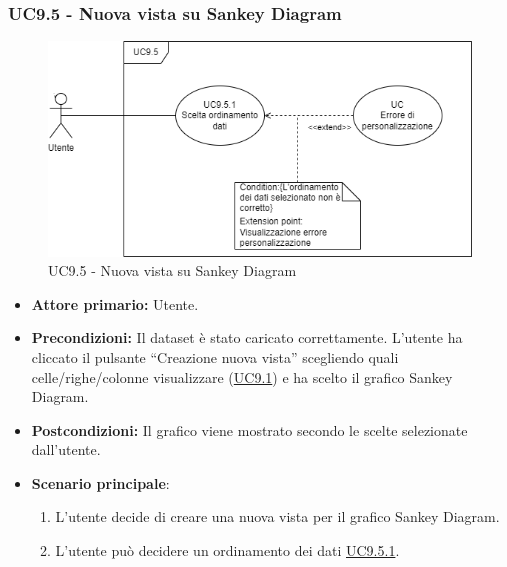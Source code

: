 \subsubsection{UC9.5 - Nuova vista su Sankey Diagram}
\label{sec:UC9.5}
\begin{figure}[h!]
	\centering
	\includegraphics[scale=0.55]{../../assets/creazionevista_sankey.png}
	\caption{UC9.5 - Nuova vista su Sankey Diagram}
\end{figure}
\begin{itemize}
    \item \textbf{Attore primario:} Utente.
    \item \textbf{Precondizioni:} Il dataset è stato caricato correttamente. L'utente ha cliccato il pulsante ``Creazione nuova vista'' scegliendo quali celle/righe/colonne visualizzare (\hyperref[sec:UC9.1]{UC9.1}) e ha scelto il grafico Sankey Diagram.
    \item \textbf{Postcondizioni:} Il grafico viene mostrato secondo le scelte selezionate dall'utente.
    \item \textbf{Scenario principale}:
    \begin{enumerate}
		\item L'utente decide di creare una nuova vista per il grafico Sankey Diagram.
		\item L'utente può decidere un ordinamento dei dati \hyperref[sec:UC9.5.1]{UC9.5.1}.
	\end{enumerate}
\end{itemize}

